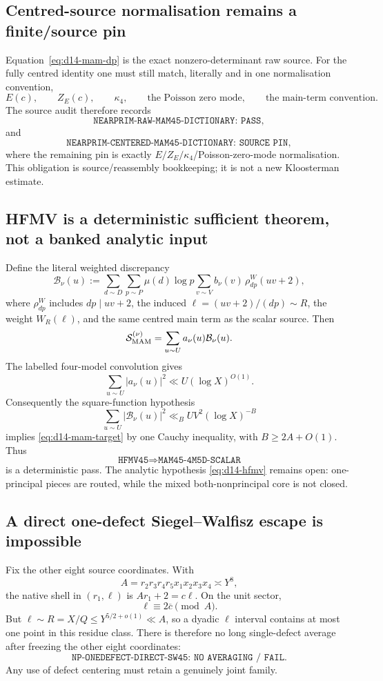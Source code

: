 \documentclass[11pt]{article}
\theoremstyle{definition}
\newcommand{\1}{\mathbf 1}
\begin{document}
\subsection{Centred-source normalisation remains a finite/source pin}
Equation~\eqref{eq:d14-mam-dp} is the exact nonzero-determinant raw source.
For the fully centred identity one must still match, literally and in one
normalisation convention,
\[
 E(c),\qquad Z_E(c),\qquad \kappa_4,\qquad
 \text{the Poisson zero mode},\qquad \text{the main-term convention}.
\]
The source audit therefore records
\[
 \boxed{\texttt{NEARPRIM-RAW-MAM45-DICTIONARY: PASS}},
\]
and
\[
 \boxed{\texttt{NEARPRIM-CENTERED-MAM45-DICTIONARY: SOURCE PIN}},
\]
where the remaining pin is exactly
$E/Z_E/\kappa_4$/Poisson-zero-mode normalisation.
This obligation is source/reassembly bookkeeping; it is not a new Kloosterman
estimate.

\subsection{HFMV is a deterministic sufficient theorem, not a banked analytic input}
Define the literal weighted discrepancy
\[
 \mathcal B_\nu(u)
 :=\sum_{d\sim D}\sum_{p\sim P}\mu(d)\log p
   \sum_{v\sim V}b_\nu(v)\,\rho^W_{dp}(uv+2),
\]
where $\rho^W_{dp}$ includes $dp\mid uv+2$, the induced
$\ell=(uv+2)/(dp)\sim R$, the weight $W_R(\ell)$, and the same centred main
term as the scalar source.  Then
\[
 \mathcal S_{\rm MAM}^{(\nu)}=\sum_{u\sim U}a_\nu(u)\mathcal B_\nu(u).
\]
The labelled four-model convolution gives
\[
 \sum_{u\sim U}|a_\nu(u)|^2\ll U(\log X)^{O(1)}.
\]
Consequently the square-function hypothesis
\begin{equation}
 \sum_{u\sim U}|\mathcal B_\nu(u)|^2
 \ll_B UV^2(\log X)^{-B}
\label{eq:d14-hfmv}
\end{equation}
implies \eqref{eq:d14-mam-target} by one Cauchy inequality, with
$B\ge 2A+O(1)$.  Thus
\[
 \boxed{\texttt{HFMV45}\Longrightarrow\texttt{MAM45-4M5D-SCALAR}}
\]
is a deterministic pass.  The analytic hypothesis \eqref{eq:d14-hfmv}
remains open: one-principal pieces are routed, while the mixed
both-nonprincipal core is not closed.

\subsection{A direct one-defect Siegel--Walfisz escape is impossible}
Fix the other eight source coordinates.  With
\[
 A=r_2r_3r_4r_5x_1x_2x_3x_4\asymp Y^8,
\]
the native shell in $(r_1,\ell)$ is $Ar_1+2=c\ell$.  On the unit sector,
\[
 \ell\equiv2\overline c\pmod A.
\]
But $\ell\sim R=X/Q\le Y^{5/2+o(1)}\ll A$, so a dyadic $\ell$ interval
contains at most one point in this residue class.  There is therefore no long
single-defect average after freezing the other eight coordinates:
\[
 \boxed{\texttt{NP-ONEDEFECT-DIRECT-SW45: NO AVERAGING / FAIL}.}
\]
Any use of defect centering must retain a genuinely joint family.
\end{document}
